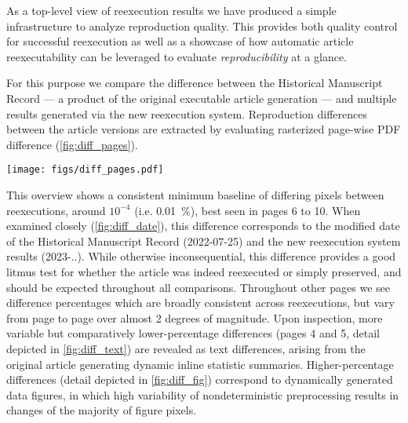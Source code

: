 As a top-level view of reexecution results we have produced a simple infrastructure to analyze reproduction quality.
This provides both quality control for successful reexecution as well as a showcase of how automatic article reexecutability can be leveraged to evaluate \textit{reproducibility} at a glance.

For this purpose we compare the difference between the Historical Manuscript Record — a product of the original executable article generation — and multiple results generated via the new reexecution system.
Reproduction differences between the article versions are extracted by evaluating rasterized page-wise PDF difference (\ref{fig:diff_pages}).

\begin{figure*}
	\centering
	\texttt{[image: figs/diff\_pages.pdf]}
	\caption{
		\textbf{Page-wise visual differences between the Historical Manuscript Record and new reexecution system results help identify overall reproduction fidelity, and identify pages with noteworthy differences.}
		Depicted are rasterized document differences, weighted 1 for changes in any pixel color channel, and rounded to four decimal points.
		Error bars represent the  percentile confidence interval.
	}
	\label{fig:diff_pages}
\end{figure*}

This overview shows a consistent minimum baseline of differing pixels between reexecutions, around $10^{-4}$ (i.e. \SI{0.01}{\percent}), best seen in pages 6 to 10.
When examined closely (\ref{fig:diff_date}), this difference corresponds to the modified date of the Historical Manuscript Record (2022-07-25) and the new reexecution system results (2023-..).
While otherwise inconsequential, this difference provides a good litmus test for whether the article was indeed reexecuted or simply preserved, and should be expected throughout all comparisons.
Throughout other pages we see difference percentages which are broadly consistent across reexecutions, but vary from page to page over almost 2 degrees of magnitude.
Upon inspection, more variable but comparatively lower-percentage differences (pages 4 and 5, detail depicted in \cref{fig:diff_text}) are revealed as text differences, arising from the original article generating dynamic inline statistic summaries.
Higher-percentage differences (detail depicted in \cref{fig:diff_fig}) correspond to dynamically generated data figures, in which high variability of nondeterministic preprocessing results in changes of the majority of figure pixels.

